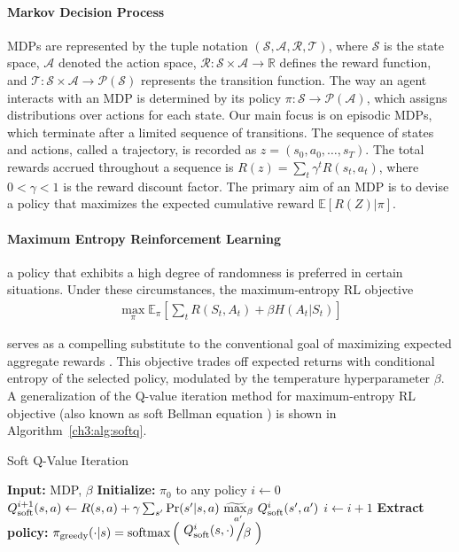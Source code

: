 \paragraph{Markov Decision Process}  MDPs are represented by the tuple notation $(\mathcal{S}, \mathcal{A}, \mathcal{R}, \mathcal{T})$, where $\mathcal{S}$ is the state space, $\mathcal{A}$ denoted the action space, $\mathcal{R}: \mathcal{S} \times \mathcal{A} \rightarrow \mathbb{R}$ defines the reward function, and $\mathcal{T}: \mathcal{S} \times \mathcal{A} \rightarrow \mathcal{P}(\mathcal{S})$ represents the transition function. The way an agent interacts with an MDP is determined by its policy $\pi: \mathcal{S} \rightarrow \mathcal{P}(\mathcal{A})$, which assigns distributions over actions for each state. Our main focus is on episodic MDPs, which terminate after a limited sequence of transitions. The sequence of states and actions, called a trajectory, is recorded as $z = (s_0, a_0, \ldots, s_T)$. The total rewards accrued throughout a sequence is $R(z) = \sum_t \gamma^t R(s_t, a_t)$, where $0<\gamma<1$ is the reward discount factor. The primary aim of an MDP is to devise a policy that maximizes the expected cumulative reward $\mathbb{E}[R(Z) | \pi]$.

\paragraph{Maximum Entropy Reinforcement Learning} a policy that exhibits a high degree of randomness is preferred in certain situations. Under these circumstances, the maximum-entropy RL objective
\begin{align}
    \max_{\pi} \mathbb{E}_{\pi} \left[ \sum_{t} R(S_t, A_t) + \beta H(A_t | S_t) \right] \label{ch3:eq:maxentrl}
\end{align}

serves as a compelling substitute to the conventional goal of maximizing expected aggregate rewards \cite{ziebart2008maximum}. This objective trades off expected returns with conditional entropy of the selected policy, modulated by the temperature hyperparameter $\beta$. A generalization of the Q-value iteration method for maximum-entropy RL objective (also known as soft Bellman equation \cite{sutton2018reinforcement}) is shown in Algorithm~\ref{ch3:alg:softq}.

\begin{algorithm}
\caption{Soft Q-Value Iteration}\label{ch3:alg:softq}
\begin{algorithmic}[1]
\State \textbf{Input:} MDP, $\beta$
\State \textbf{Initialize:} $\pi_0$ to any policy
\State $i \gets 0$
\Repeat
    \State $Q^{i+1}_{\text{soft}}(s,a) \gets R(s,a) + \gamma \sum_{s'} \text{Pr}(s'|s,a) \ \stackMath\stackunder[0.1pt]{\widetilde{\max}_\beta}{_{a'}} \ Q^{i}_{\text{soft}}(s',a')$
    \State $i \gets i + 1$
\State \textbf{Extract policy:} $\pi_{\text{greedy}}(\cdot |s) = \text{softmax}\left(\altfrac{Q^{i}_{\text{soft}}(s,\cdot)}{\beta}\right)$
\end{algorithmic}
\end{algorithm}


